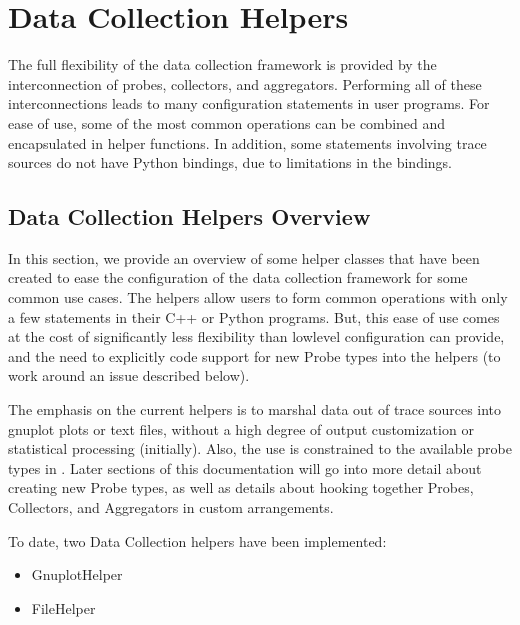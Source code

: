 \documentclass[letterpaper,10pt,english]{sphinxmanual}
\begin{document}
\section{Data Collection Helpers}
\label{\detokenize{data-collection-helpers:data-collection-helpers}}\label{\detokenize{data-collection-helpers::doc}}
The full flexibility of the data collection framework is provided by
the interconnection of probes, collectors, and aggregators.  Performing
all of these interconnections leads to many configuration statements
in user programs.  For ease of use, some of the most common operations
can be combined and encapsulated in helper functions.  In addition,
some statements involving  trace sources do not have Python
bindings, due to limitations in the bindings.


\subsection{Data Collection Helpers Overview}
\label{\detokenize{data-collection-helpers:data-collection-helpers-overview}}
In this section, we provide an overview of some helper classes that
have been created to ease the configuration of the data collection
framework for some common use cases.  The helpers allow users to form
common operations with only a few statements in their C++ or Python
programs.  But, this ease of use comes at the cost of significantly
less flexibility than low\sphinxhyphen{}level configuration can provide, and the
need to explicitly code support for new Probe types into the helpers
(to work around an issue described below).

The emphasis on the current helpers is to marshal data out of 
trace sources into gnuplot plots or text files, without a high degree
of output customization or statistical processing (initially).  Also,
the use is constrained to the available probe types in .  Later
sections of this documentation will go into more detail about creating
new Probe types, as well as details about hooking together Probes,
Collectors, and Aggregators in custom arrangements.

To date, two Data Collection helpers have been implemented:
\begin{itemize}
\item {} 
GnuplotHelper

\item {} 
FileHelper

\end{itemize}
\end{document}
